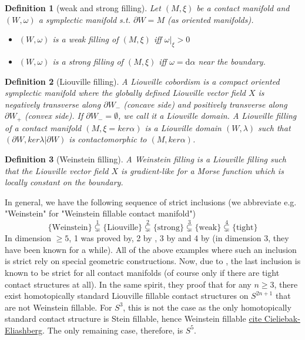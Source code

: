 \documentclass{amsart}
\newtheorem{definition}{Definition}
\renewcommand*{\d}{\mathrm{d}}
\begin{document}
\begin{definition}[weak and strong filling]
    Let $(M, \xi)$ be a contact manifold and $(W, \omega)$ a symplectic manifold s.t. $\partial W = M$ (as oriented manifolds).
    \begin{itemize}
        \item $(W, \omega)$ is a weak filling of $(M, \xi)$ iff $\omega|_\xi > 0$
        \item $(W, \omega)$ is a strong filling of $(M, \xi)$ iff $\omega = \d \alpha$ near the boundary.
    \end{itemize}
\end{definition}


\begin{definition}[Liouville filling]
    A Liouville cobordism is a compact oriented symplectic manifold where the globally defined Liouville vector field $X$ is negatively transverse  along $\partial W_-$ (concave side) and positively transverse along $\partial W_+$ (convex side).
    If $\partial W_- = \emptyset$, we call it a Liouville domain.
    A Liouville filling of a contact manifold $(M, \xi = ker \alpha)$ is a Liouville domain $(W, \lambda)$ such that $(\partial W, ker \lambda|\partial W)$ is contactomorphic to $(M, ker \alpha)$.
\end{definition}

\begin{definition}[Weinstein filling]
    A Weinstein filling is a Liouville filling such that the Liouville vector field $X$ is gradient-like for a Morse function which is locally constant on the boundary.
\end{definition}

In general, we have the following sequence of strict inclusions (we abbreviate e.g. "Weinstein" for "Weinstein fillable contact manifold")
\[
      \{\text{Weinstein}\} \overset{1}{\subsetneq} \{\text{Liouville}\} \overset{2}{\subsetneq} \{\text{strong}\} \overset{3}{\subsetneq} \{\text{weak}\} \overset{4}{\subsetneq} \{\text{tight}\}
\]
In dimension $\ge 5$, 1 was proved by\cite[Theorem 1.5]{BCS14}, 2 by \cite{Zhou21}, 3 by \cite{BGM22} and 4 by \cite{MNW13} (in dimension 3, they have been known for a while).
All of the above examples where such an inclusion is strict rely on special geometric
constructions. 
Now, due to \cite{BGMZ22}, the last inclusion is known to be strict for all contact manifolds (of course only if there are tight contact structures at all).
In the same spirit, they proof that for any $n \geq 3$, there exist homotopically standard 
Liouville fillable contact structures on $S^{2n+1}$ that are not Weinstein fillable.
For $S^3$, this is not the case as the only homotopically standard contact structure is
Stein fillable, hence Weinstein fillable \underline{cite Cieliebak-Eliashberg}.
The only remaining case, therefore, is $S^5$.
\end{document}
